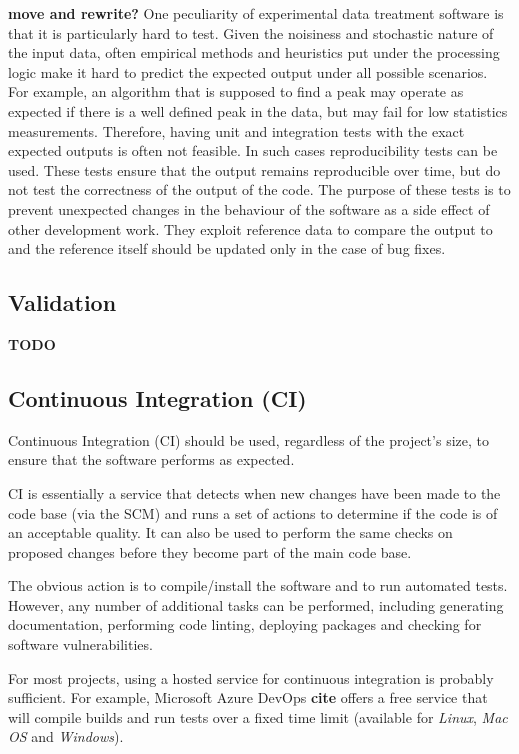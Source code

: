 \documentclass[jnr]{iosart2x}
\newcommand{\todo}[1]{\textbf{#1}}
\begin{document}
\todo{move and rewrite?}
One peculiarity of experimental data treatment software is that it is particularly hard to test.
Given the noisiness and stochastic nature of the input data, often empirical methods and heuristics put under the processing logic make it hard to predict the expected output under all possible scenarios.
For example, an algorithm that is supposed to find a peak may operate as expected if there is a well defined peak in the data, but may fail for low statistics measurements.
Therefore, having unit and integration tests with the exact expected outputs is often not feasible.
In such cases reproducibility tests can be used.
These tests ensure that the output remains reproducible over time, but do not test the correctness of the output of the code.
The purpose of these tests is to prevent unexpected changes in the behaviour of the software as a side effect of other development work.
They exploit reference data to compare the output to and the reference itself should be updated only in the case of bug fixes.

\subsection{Validation}
\label{Validation}

\todo{TODO}

\subsection{Continuous Integration (CI)}
\label{Continuous integration}

Continuous Integration (CI) should be used, regardless of the project's size, to ensure that the software performs as expected.

CI is essentially a service that detects when new changes have been made to the code base (via the SCM) and runs a set of actions to determine if the code is of an acceptable quality.
It can also be used to perform the same checks on proposed changes before they become part of the main code base.

The obvious action is to compile/install the software and to run automated tests.
However, any number of additional tasks can be performed, including generating documentation, performing code linting, deploying packages and checking for software vulnerabilities.

For most projects, using a hosted service for continuous integration is probably sufficient.
For example, Microsoft Azure DevOps \todo{cite} offers a free service that will compile builds and run tests over a fixed time limit (available for {\it Linux}, {\it Mac OS} and {\it Windows}).
\end{document}
